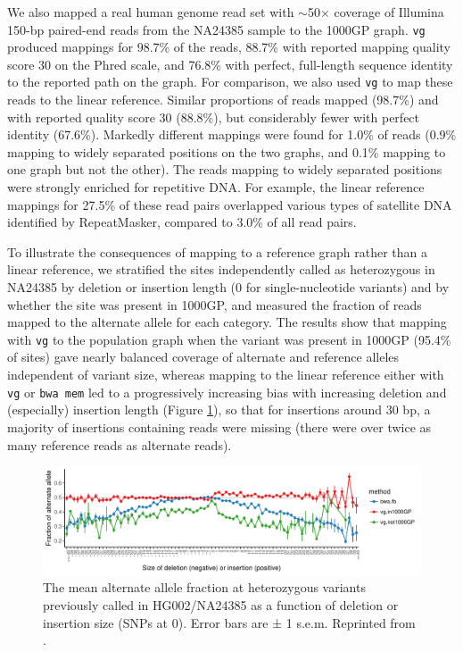 \documentclass[a4paper,12pt,numbered,oneside]{Classes/PhDThesisPSnPDF}
\begin{document}
We also mapped a real human genome read set with $\sim$50× coverage of Illumina 150-bp paired-end reads from the NA24385 sample to the 1000GP graph. {\tt vg} produced mappings for 98.7\% of the reads, 88.7\%
with reported mapping quality score 30 on the Phred scale, and 76.8\% with perfect, full-length sequence identity to the reported path on the graph.
For comparison, we also used {\tt vg} to map these reads to the linear reference.
Similar proportions of reads mapped (98.7\%) and with reported quality score 30 (88.8\%), but considerably fewer with perfect identity (67.6\%).
Markedly different mappings were found for 1.0\% of reads (0.9\% mapping to widely separated positions on the two graphs, and 0.1\% mapping to one graph but not the other).
The reads mapping to widely separated positions were strongly enriched for repetitive DNA. For example, the linear reference mappings for 27.5\% of these read pairs overlapped various types of satellite DNA identified by RepeatMasker, compared to 3.0\% of all read pairs.

To illustrate the consequences of mapping to a reference graph rather than a linear reference, we stratified the sites independently called as heterozygous in NA24385 by deletion or insertion length (0 for single-nucleotide variants) and by whether the site was present in 1000GP, and measured the fraction of reads mapped to the alternate allele for each category.
The results show that mapping with {\tt vg} to the population graph when the variant was present in 1000GP (95.4\% of sites) gave nearly balanced coverage of alternate and reference alleles independent of variant size, whereas mapping to the linear reference either with {\tt vg} or {\tt bwa mem} led to a progressively increasing bias with increasing deletion and (especially) insertion length (Figure \ref{fig:HG002_indels}), so that for insertions around 30 bp, a majority of insertions containing reads were missing (there were over twice as many reference reads as alternate reads).

\begin{figure}[htbp!] 
\centering    
\includegraphics[width=1.0\textwidth]{Chapter3/Figs/HG002_wg_pan_ref_bwa_true_hets_allele_balance_tsv_gz_3.pdf}
\caption[Indel allele balance in HG002]{The mean alternate allele fraction at heterozygous variants previously called in HG002/NA24385 as a function of deletion or insertion size (SNPs at 0). Error bars are ± 1 s.e.m.
  Reprinted from \cite{garrison2018variation}.}
\label{fig:HG002_indels}
\end{figure}
\end{document}
